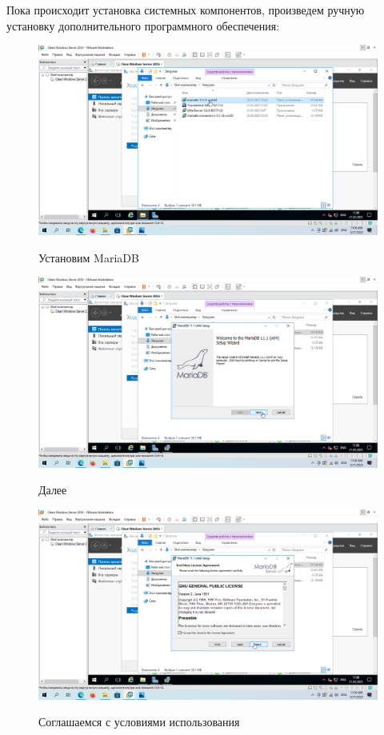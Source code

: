 \documentclass[a4paper]{article}
\begin{document}
  Пока происходит установка системных компонентов, произведем ручную
  установку дополнительного программного обеспечения:

  \begin{figure}[H]
    \centering
    \includegraphics[width=\textwidth]{11_0016}
    \label{img:16}
    \caption{Установим MariaDB}
  \end{figure}

  \begin{figure}[H]
    \centering
    \includegraphics[width=\textwidth]{11_0017}
    \label{img:17}
    \caption{Далее}
  \end{figure}

  \begin{figure}[H]
    \centering
    \includegraphics[width=\textwidth]{11_0018}
    \label{img:18}
    \caption{Соглашаемся с условиями использования}
  \end{figure}
\end{document}
